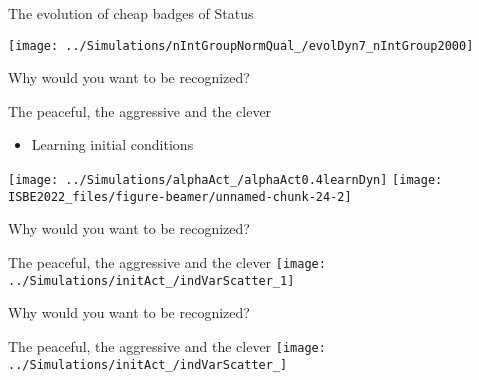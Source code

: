 \documentclass[
  ignorenonframetext,
]{beamer}
\providecommand{\tightlist}{%
  \setlength{\itemsep}{0pt}\setlength{\parskip}{0pt}}
\begin{document}
\begin{frame}{The evolution of cheap badges of Status}
\protect\hypertarget{the-evolution-of-cheap-badges-of-status}{}
\begin{center}\texttt{[image: ../Simulations/nIntGroupNormQual\_/evolDyn7\_nIntGroup2000]} \end{center}
\end{frame}

\begin{frame}{Why would you want to be recognized?}
\protect\hypertarget{why-would-you-want-to-be-recognized}{}
\vspace{-1cm}

\begin{block}{The peaceful, the aggressive and the clever}
\protect\hypertarget{the-peaceful-the-aggressive-and-the-clever}{}
\begin{itemize}
\tightlist
\item
  Learning initial conditions
\end{itemize}

\texttt{[image: ../Simulations/alphaAct\_/alphaAct0.4learnDyn]}
\texttt{[image: ISBE2022\_files/figure-beamer/unnamed-chunk-24-2]}
\end{block}
\end{frame}

\begin{frame}{Why would you want to be recognized?}
\protect\hypertarget{why-would-you-want-to-be-recognized-1}{}
\begin{block}{The peaceful, the aggressive and the clever}
\protect\hypertarget{the-peaceful-the-aggressive-and-the-clever-1}{}
\texttt{[image: ../Simulations/initAct\_/indVarScatter\_1]}
\end{block}
\end{frame}

\begin{frame}{Why would you want to be recognized?}
\protect\hypertarget{why-would-you-want-to-be-recognized-2}{}
\begin{block}{The peaceful, the aggressive and the clever}
\protect\hypertarget{the-peaceful-the-aggressive-and-the-clever-2}{}
\texttt{[image: ../Simulations/initAct\_/indVarScatter\_]}
\end{block}
\end{frame}
\end{document}
